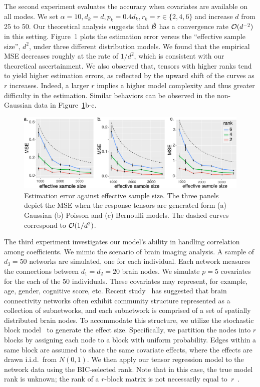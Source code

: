 \documentclass[12pt]{article}
\theoremstyle{plain}
\theoremstyle{definition}
\begin{document}
The second experiment evaluates the accuracy when covariates are available on all modes. We set $\alpha=10, d_k=d, p_k=0.4d_k, r_k=r\in\{2,4,6\}$ and increase $d$ from 25 to 50. Our theoretical analysis suggests that $\hat {\mathcal{B}}$ has a convergence rate $\mathcal{O}(d^{-2})$ in this setting. Figure~1 plots the estimation error versus the ``effective sample size'', $d^2$, under three different distribution models. We found that the empirical MSE decreases roughly at the rate of $1/d^2$, which is consistent with our theoretical ascertainment. We also observed that, tensors with higher ranks tend to yield higher estimation errors, as reflected by the upward shift of the curves as $r$ increases. Indeed, a larger $r$ implies a higher model complexity and thus greater difficulty in the estimation. Similar behaviors can be observed in the non-Gaussian data in Figure~\ref{fig:dim}b-c. 

\begin{figure}[t]
\centering
\includegraphics[width=15cm]{dimension.pdf}
\caption{Estimation error against effective sample size. The three panels depict the MSE when the response tensors are generated form (a) Gaussian (b) Poisson and (c) Bernoulli models. The dashed curves correspond to $\mathcal{O}({1/d^2})$.}\label{fig:dim}
\end{figure}

The third experiment investigates our model's ability in handling correlation among coefficients. We mimic the scenario of brain imaging analysis. A sample of $d_3=50$ networks are simulated, one for each individual. Each network measures the connections between $d_1=d_2=20$ brain nodes. We simulate $p=5$ covariates for the each of the 50 individuals. These covariates may represent, for example, age, gender, cognitive score, etc. Recent study~\citep{robinson2015dynamic} has suggested that brain connectivity networks often exhibit community structure represented as a collection of subnetworks, and each subnetwork is comprised of a set of spatially distributed brain nodes. To accommodate this structure, we utilize the stochastic block model~\citep{abbe2017community} to generate the effect size. Specifically, we partition the nodes into $r$ blocks by assigning each node to a block with uniform probability. Edges within a same block are assumed to share the same covariate effects, where the effects are drawn i.i.d.\ from $N(0,1)$. We then apply our tensor regression model to the network data using the BIC-selected rank. Note that in this case, the true model rank is unknown; the rank of a $r$-block matrix is not necessarily equal to~$r$~\citep{zeng2019multiway}. 
\end{document}
